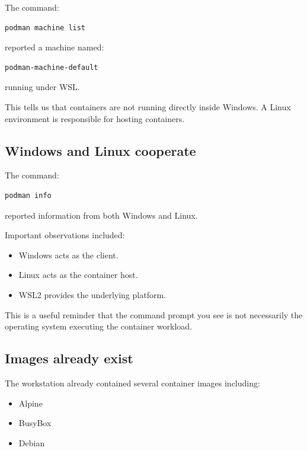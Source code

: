 The command:

\begin{lstlisting}[language=bash]
podman machine list
\end{lstlisting}

reported a machine named:

\begin{lstlisting}
podman-machine-default
\end{lstlisting}

running under WSL.

This tells us that containers are not running directly inside Windows. A Linux environment is responsible for hosting containers.

\subsection{Windows and Linux cooperate}

The command:

\begin{lstlisting}[language=bash]
podman info
\end{lstlisting}

reported information from both Windows and Linux.

Important observations included:

\begin{itemize}
  \item Windows acts as the client.
  \item Linux acts as the container host.
  \item WSL2 provides the underlying platform.
\end{itemize}

This is a useful reminder that the command prompt you see is not necessarily the operating system executing the container workload.

\subsection{Images already exist}

The workstation already contained several container images including:

\begin{itemize}
  \item Alpine
  \item BusyBox
  \item Debian
\end{itemize}

